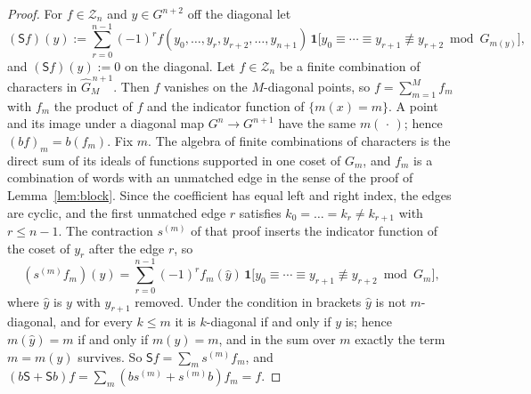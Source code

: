 \documentclass[11pt]{amsart}
\theoremstyle{definition}
\theoremstyle{remark}
\begin{document}
\begin{proof}
For $f\in\mathcal Z_n$ and $y\in G^{n+2}$ off the diagonal let
\[
(\mathsf Sf)(y):=\sum_{r=0}^{n-1}(-1)^{r}f(y_0,\dots,y_r,y_{r+2},\dots,y_{n+1})\,
\mathbf 1\bigl[y_0\equiv\cdots\equiv y_{r+1}\not\equiv y_{r+2}\bmod G_{m(y)}\bigr],
\]
and $(\mathsf Sf)(y):=0$ on the diagonal.  Let $f\in\mathcal Z_n$ be a finite
combination of characters in $\widehat G_M^{\,n+1}$.  Then $f$ vanishes on the $M$-diagonal points,
so $f=\sum_{m=1}^{M}f_m$ with $f_m$ the product of $f$ and the indicator
function of $\{m(x)=m\}$.  A point and its image under a diagonal map
$G^{n}\to G^{n+1}$ have the same $m(\,\cdot\,)$; hence $(bf)_m=b(f_m)$.  Fix
$m$.  The algebra of finite combinations of characters is the direct sum of
its ideals of functions supported in one coset of $G_m$, and $f_m$ is a
combination of words with an unmatched edge in the sense of the proof of
Lemma~\ref{lem:block}.  Since the coefficient has equal left and right index, the edges are
cyclic, and the first unmatched edge $r$ satisfies
$k_0=\dots=k_r\ne k_{r+1}$ with $r\le n-1$.  The contraction $s^{(m)}$ of that
proof inserts the indicator function of the coset of $y_r$ after the edge $r$,
so
\[
(s^{(m)}f_m)(y)=\sum_{r=0}^{n-1}(-1)^{r}f_m(\hat y)\,
\mathbf 1\bigl[y_0\equiv\cdots\equiv y_{r+1}\not\equiv y_{r+2}\bmod G_m\bigr],
\]
where $\hat y$ is $y$ with $y_{r+1}$ removed.  Under the condition in brackets
$\hat y$ is not $m$-diagonal, and for every $k\le m$ it is $k$-diagonal if and
only if $y$ is; hence $m(\hat y)=m$ if and only if $m(y)=m$, and in the sum over
$m$ exactly the term $m=m(y)$ survives.  So $\mathsf Sf=\sum_ms^{(m)}f_m$,
and $(b\mathsf S+\mathsf Sb)f=\sum_m(bs^{(m)}+s^{(m)}b)f_m=f$.


\end{proof}
\end{document}
